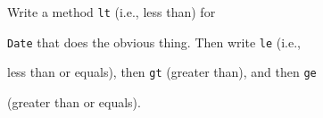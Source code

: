 Write a method \texttt{lt} (i.e., less than) for

\texttt{Date} that does the obvious thing. Then write \texttt{le} (i.e.,

less than or equals), then \texttt{gt} (greater than), and then \texttt{ge}

(greater than or equals).

